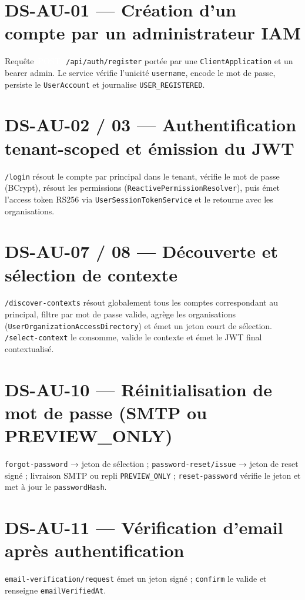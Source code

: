 \documentclass[11pt,a4paper,oneside]{report}
\newcommand{\code}[1]{\texttt{\small #1}}
\newcommand{\httppost}{\textcolor{white}{\colorbox{green!45!black}{\scriptsize\ttfamily\,POST\,}}}
\begin{document}
\section{DS-AU-01 — Création d'un compte par un administrateur IAM}
Requête \httppost~\code{/api/auth/register} portée par une \code{ClientApplication} et un
bearer admin. Le service vérifie l'unicité \code{username}, encode le mot de passe, persiste
le \code{UserAccount} et journalise \code{USER\_REGISTERED}.

\section{DS-AU-02 / 03 — Authentification tenant-scoped et émission du JWT}
\code{/login} résout le compte par principal dans le tenant, vérifie le mot de passe
(BCrypt), résout les permissions (\code{ReactivePermissionResolver}), puis émet l'access
token RS256 via \code{UserSessionTokenService} et le retourne avec les organisations.

\section{DS-AU-07 / 08 — Découverte et sélection de contexte}
\code{/discover-contexts} résout globalement tous les comptes correspondant au principal,
filtre par mot de passe valide, agrège les organisations (\code{UserOrganizationAccessDirectory})
et émet un jeton court de sélection. \code{/select-context} le consomme, valide le contexte et
émet le JWT final contextualisé.

\section{DS-AU-10 — Réinitialisation de mot de passe (SMTP ou PREVIEW\_ONLY)}
\code{forgot-password} → jeton de sélection ; \code{password-reset/issue} → jeton de reset
signé ; livraison SMTP ou repli \code{PREVIEW\_ONLY} ; \code{reset-password} vérifie le jeton
et met à jour le \code{passwordHash}.

\section{DS-AU-11 — Vérification d'email après authentification}
\code{email-verification/request} émet un jeton signé ; \code{confirm} le valide et
renseigne \code{emailVerifiedAt}.
\end{document}
